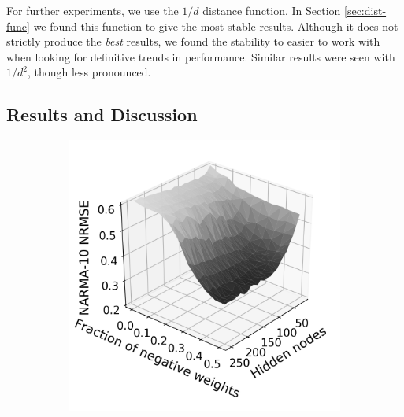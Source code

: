 For further experiments, we use the $1/d$ distance function. In Section
\ref{sec:dist-func} we found this function to give the most stable
results. Although it does not strictly produce the \textit{best} results, we
found the stability to easier to work with when looking for definitive trends in
performance. Similar results were seen with $1/d^2$, though less pronounced.

\subsection{Results and Discussion}

\begin{figure}[t]
  \centering
  \begin{subfigure}{.49\textwidth}
    \centering
    \includegraphics[width=1.0\linewidth]{figures/perf-rest-undir.png}
    \caption{}
    \label{fig:perf-restore-a}
  \end{subfigure}
  \begin{subfigure}{.49\textwidth}
    \centering

\end{subfigure}
\end{figure}
